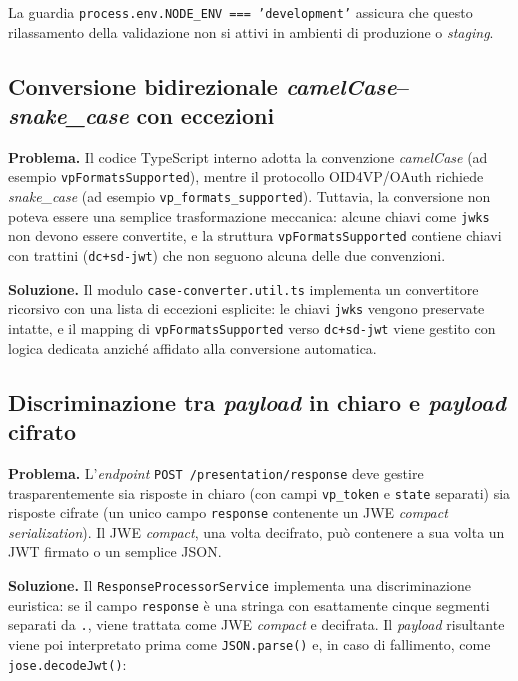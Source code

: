La guardia \texttt{process.env.NODE\_\allowbreak{}ENV === 'development'} assicura che questo rilassamento della validazione non si attivi in ambienti di produzione o \textit{staging}.

\subsection{Conversione bidirezionale \textit{camelCase}--\textit{snake\_case} con eccezioni}
\textbf{Problema.} Il codice TypeScript interno adotta la convenzione \textit{camelCase} (ad esempio \texttt{vpFormatsSupported}), mentre il protocollo OID4VP/OAuth richiede \textit{snake\_case} (ad esempio \texttt{vp\_\allowbreak{}formats\_\allowbreak{}supported}). Tuttavia, la conversione non poteva essere una semplice trasformazione meccanica: alcune chiavi come \texttt{jwks} non devono essere convertite, e la struttura \texttt{vpFormatsSupported} contiene chiavi con trattini (\texttt{dc+sd-\allowbreak{}jwt}) che non seguono alcuna delle due convenzioni.

\textbf{Soluzione.} Il modulo \texttt{case-\allowbreak{}converter.util.ts} implementa un convertitore ricorsivo con una lista di eccezioni esplicite: le chiavi \texttt{jwks} vengono preservate intatte, e il mapping di \texttt{vpFormatsSupported} verso \texttt{dc+sd-\allowbreak{}jwt} viene gestito con logica dedicata anziché affidato alla conversione automatica.

\subsection{Discriminazione tra \textit{payload} in chiaro e \textit{payload} cifrato}
\textbf{Problema.} L'\textit{endpoint} \texttt{POST /presentation/response} deve gestire trasparentemente sia risposte in chiaro (con campi \texttt{vp\_\allowbreak{}token} e \texttt{state} separati) sia risposte cifrate (un unico campo \texttt{response} contenente un JWE \textit{compact serialization}). Il JWE \textit{compact}, una volta decifrato, può contenere a sua volta un JWT firmato o un semplice JSON.

\textbf{Soluzione.} Il \texttt{ResponseProcessorService} implementa una discriminazione euristica: se il campo \texttt{response} è una stringa con esattamente cinque segmenti separati da \texttt{.}, viene trattata come JWE \textit{compact} e decifrata. Il \textit{payload} risultante viene poi interpretato prima come \texttt{JSON.parse()} e, in caso di fallimento, come \texttt{jose.decodeJwt()}:

